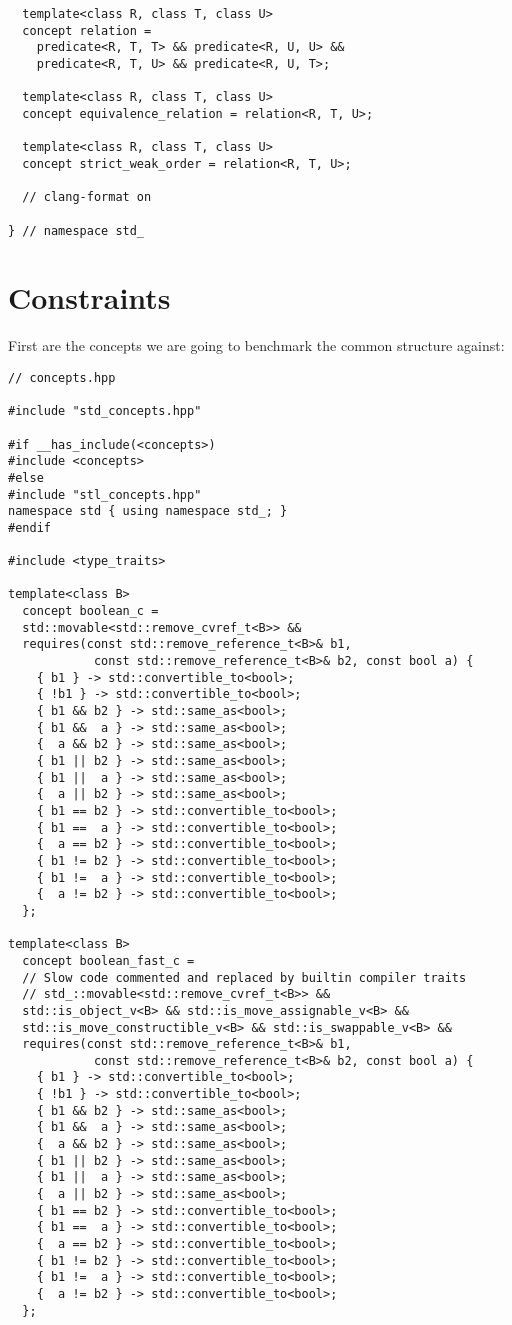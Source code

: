 \begin{verbatim}
  template<class R, class T, class U>
  concept relation =
    predicate<R, T, T> && predicate<R, U, U> &&
    predicate<R, T, U> && predicate<R, U, T>;

  template<class R, class T, class U>
  concept equivalence_relation = relation<R, T, U>;

  template<class R, class T, class U>
  concept strict_weak_order = relation<R, T, U>;

  // clang-format on

} // namespace std_
\end{verbatim}

\section{Constraints}

First are the concepts we are going to benchmark the common structure against:
\begin{verbatim}
// concepts.hpp

#include "std_concepts.hpp"

#if __has_include(<concepts>)
#include <concepts>
#else
#include "stl_concepts.hpp"
namespace std { using namespace std_; }
#endif

#include <type_traits>

template<class B>
  concept boolean_c =
  std::movable<std::remove_cvref_t<B>> &&
  requires(const std::remove_reference_t<B>& b1,
            const std::remove_reference_t<B>& b2, const bool a) {
    { b1 } -> std::convertible_to<bool>;
    { !b1 } -> std::convertible_to<bool>;
    { b1 && b2 } -> std::same_as<bool>;
    { b1 &&  a } -> std::same_as<bool>;
    {  a && b2 } -> std::same_as<bool>;
    { b1 || b2 } -> std::same_as<bool>;
    { b1 ||  a } -> std::same_as<bool>;
    {  a || b2 } -> std::same_as<bool>;
    { b1 == b2 } -> std::convertible_to<bool>;
    { b1 ==  a } -> std::convertible_to<bool>;
    {  a == b2 } -> std::convertible_to<bool>;
    { b1 != b2 } -> std::convertible_to<bool>;
    { b1 !=  a } -> std::convertible_to<bool>;
    {  a != b2 } -> std::convertible_to<bool>;
  };

template<class B>
  concept boolean_fast_c =
  // Slow code commented and replaced by builtin compiler traits
  // std_::movable<std::remove_cvref_t<B>> && 
  std::is_object_v<B> && std::is_move_assignable_v<B> &&
  std::is_move_constructible_v<B> && std::is_swappable_v<B> &&
  requires(const std::remove_reference_t<B>& b1,
            const std::remove_reference_t<B>& b2, const bool a) {
    { b1 } -> std::convertible_to<bool>;
    { !b1 } -> std::convertible_to<bool>;
    { b1 && b2 } -> std::same_as<bool>;
    { b1 &&  a } -> std::same_as<bool>;
    {  a && b2 } -> std::same_as<bool>;
    { b1 || b2 } -> std::same_as<bool>;
    { b1 ||  a } -> std::same_as<bool>;
    {  a || b2 } -> std::same_as<bool>;
    { b1 == b2 } -> std::convertible_to<bool>;
    { b1 ==  a } -> std::convertible_to<bool>;
    {  a == b2 } -> std::convertible_to<bool>;
    { b1 != b2 } -> std::convertible_to<bool>;
    { b1 !=  a } -> std::convertible_to<bool>;
    {  a != b2 } -> std::convertible_to<bool>;
  };
\end{verbatim}

